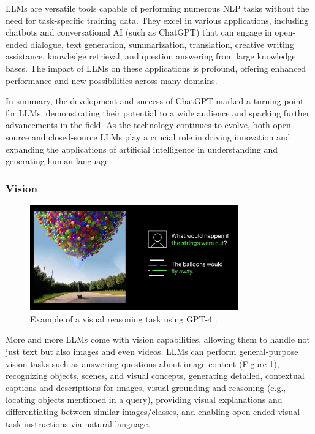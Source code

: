 \documentclass{article}
\begin{document}
LLMs are versatile tools capable of performing numerous NLP
tasks without the need for task-specific training data.
They excel in various applications, including chatbots and
conversational AI (such as ChatGPT) that can engage
in open-ended dialogue, text generation, summarization,
translation, creative writing assistance, knowledge retrieval,
and question answering from large knowledge bases.
The impact of LLMs on these applications is profound,
offering enhanced performance and new possibilities across many domains.

In summary, the development and success of ChatGPT marked
a turning point for LLMs, demonstrating their potential
to a wide audience and sparking further advancements in the field.
As the technology continues to evolve, both open-source and closed-source
LLMs play a crucial role in driving innovation and expanding the applications
of artificial intelligence in understanding and generating human language.


\subsubsection{Vision}


\begin{figure}[h]
    \centering
    \includegraphics[width=0.8\textwidth]{images/gpt4-image-description.png}
    \caption{Example of a visual reasoning task using GPT-4 \cite{globalnews_gpt4}.}
    \label{fig:vision_task_example}
\end{figure}

More and more LLMs come with vision capabilities, allowing them to handle not just text but also images and even videos.
LLMs can perform general-purpose vision tasks such as answering questions about image content %
(Figure \ref{fig:vision_task_example}),
recognizing objects, scenes, and visual concepts, generating detailed, contextual captions
and descriptions for images, visual grounding and reasoning (e.g., locating objects mentioned in a query),
providing visual explanations and differentiating between
similar images/classes, and enabling open-ended visual
task instructions via natural language.
\end{document}
